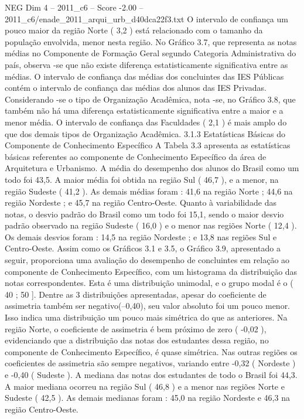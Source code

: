 \begin{textsample}{NEG Dim 4 – 2011\_c6 – Score -2.00 – 2011\_c6/enade\_2011\_arqui\_urb\_d40dca22f3.txt}
O intervalo de confiança um pouco maior da região Norte ( 3,2 ) está relacionado com o tamanho da população envolvida, menor nesta região.
No Gráfico 3.7, que representa as notas médias no Componente de Formação Geral segundo Categoria Administrativa do país, observa -se que não existe diferença estatisticamente significativa entre as médias.
O intervalo de confiança das médias dos concluintes das IES Públicas contém o intervalo de confiança das médias dos alunos das IES Privadas.
Considerando -se o tipo de Organização Acadêmica, nota -se, no Gráfico 3.8, que também não há uma diferença estatisticamente significativa entre a maior e a menor média.
O intervalo de confiança das Faculdades ( 2,1 ) é mais amplo do que dos demais tipos de Organização Acadêmica. 3.1.3 Estatísticas Básicas do Componente de Conhecimento Específico A Tabela 3.3 apresenta as estatísticas básicas referentes ao componente de Conhecimento Específico da área de Arquitetura e Urbanismo.
A média do desempenho dos alunos do Brasil como um todo foi 43,5.
A maior média foi obtida na região Sul ( 46,7 ), e a menor, na região Sudeste ( 41,2 ).
As demais médias foram : 41,6 na região Norte ; 44,6 na região Nordeste ; e 45,7 na região Centro-Oeste.
Quanto à variabilidade das notas, o desvio padrão do Brasil como um todo foi 15,1, sendo o maior desvio padrão observado na região Sudeste ( 16,0 ) e o menor nas regiões Norte ( 12,4 ).
Os demais desvios foram : 14,5 na região Nordeste ; e 13,8 nas regiões Sul e Centro-Oeste.
Assim como os Gráficos 3.1 e 3.5, o Gráfico 3.9, apresentado a seguir, proporciona uma avaliação do desempenho de concluintes em relação ao componente de Conhecimento Específico, com um histograma da distribuição das notas correspondentes.
Esta é uma distribuição unimodal, e o grupo modal é o ( 40 ; 50 ].
Dentre as 3 distribuições apresentadas, apesar do coeficiente de assimetria também ser negativo(–0,40), seu valor absoluto foi um pouco menor.
Isso indica uma distribuição um pouco mais simétrica do que as anteriores.
Na região Norte, o coeficiente de assimetria é bem próximo de zero ( -0,02 ), evidenciando que a distribuição das notas dos estudantes dessa região, no componente de Conhecimento Específico, é quase simétrica.
Nas outras regiões os coeficientes de assimetria são sempre negativos, variando entre -0,32 ( Nordeste ) e -0,40 ( Sudeste ).
A mediana das notas dos estudantes de todo o Brasil foi 44,3.
A maior mediana ocorreu na região Sul ( 46,8 ) e a menor nas regiões Norte e Sudeste ( 42,5 ).
As demais medianas foram : 45,0 na região Nordeste e 46,3 na região Centro-Oeste.

\end{textsample}
